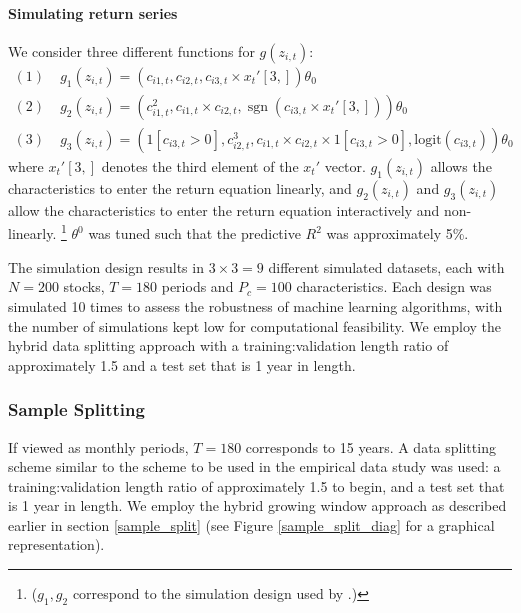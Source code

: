 \documentclass{article}
\begin{document}
\paragraph{Simulating return series}
We consider three different functions for $g(z_{i, t})$:
\begin{align}
(1)\; & g_1 \left(z_{i, t}\right)=\left(c_{i 1, t}, c_{i 2, t}, c_{i 3, t} \times x_{t}'[3,]\right) \theta_{0} \\
(2)\; & g_2 \left(z_{i, t}\right)=\left(c_{i 1, t}^{2}, c_{i 1, t} \times c_{i 2, t}, \operatorname{sgn}\left(c_{i 3, t} \times  x_{t}'[3,]\right)\right) \theta_{0} \\
(3)\; & g_3 \left(z_{i, t}\right) = \left(1[c_{i3,t}>0],c_{i 2, t}^{3}, c_{i 1, t} \times c_{i 2, t}\times 1[c_{i3,t}>0], \text{logit}\left({c}_{i3, t} \right)\right) \theta_{0}
\end{align}
where $x_{t}'[3,]$ denotes the third element of the $x_{t}'$ vector.
$g_1 \left(z_{i, t}\right)$ allows the characteristics to enter the return equation linearly, and $g_2 \left(z_{i, t}\right)$ and $g_3 \left(z_{i, t}\right)$ allow the characteristics to enter the return equation interactively and non-linearly. \footnote{($g_1, g_2$ correspond to the simulation design used by \cite{gu_empirical_2018}.)} $\theta^0$ was tuned such that the predictive $R^2$ was approximately 5\%.

The simulation design results in $3 \times 3 = 9$ different simulated datasets, each with $N = 200$ stocks, $T = 180$ periods and $P_c = 100$ characteristics. Each design was simulated 10 times to assess the robustness of machine learning algorithms, with the number of simulations kept low for computational feasibility. We employ the hybrid data splitting approach with a training:validation length ratio of approximately 1.5 and a test set that is 1 year in length. 

\subsubsection{Sample Splitting}

If viewed as monthly periods, $T = 180$ corresponds to 15 years. A data splitting scheme similar to the scheme to be used in the empirical data study was used: a training:validation length ratio of approximately 1.5 to begin, and a test set that is 1 year in length. We employ the hybrid growing window approach as described earlier in section \ref{sample_split} (see Figure \ref{sample_split_diag} for a graphical representation).
\end{document}
